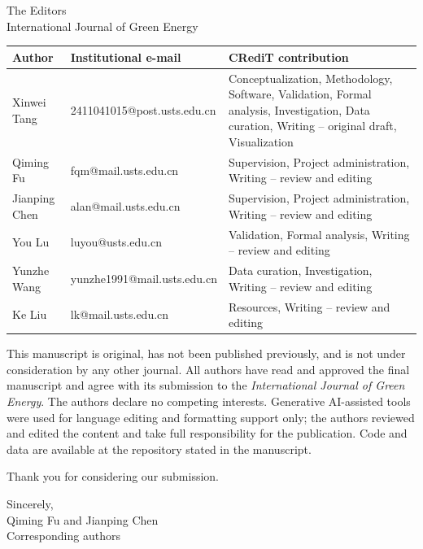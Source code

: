 \documentclass[11pt]{letter}
\begin{document}
\begin{letter}{The Editors\\International Journal of Green Energy}
\medskip
\noindent
\begin{minipage}{\linewidth}
\centering\small
\setlength{\tabcolsep}{6pt}
\begin{tabular}{@{}p{2.0cm}p{5.4cm}p{6.7cm}@{}}
\toprule
\textbf{Author} & \textbf{Institutional e-mail} & \textbf{CRediT contribution} \\
\midrule
Xinwei Tang & 2411041015@post.usts.edu.cn & Conceptualization, Methodology, Software, Validation, Formal analysis, Investigation, Data curation, Writing -- original draft, Visualization \\
Qiming Fu & fqm@mail.usts.edu.cn & Supervision, Project administration, Writing -- review and editing \\
Jianping Chen & alan@mail.usts.edu.cn & Supervision, Project administration, Writing -- review and editing \\
You Lu & luyou@usts.edu.cn & Validation, Formal analysis, Writing -- review and editing \\
Yunzhe Wang & yunzhe1991@mail.usts.edu.cn & Data curation, Investigation, Writing -- review and editing \\
Ke Liu & lk@mail.usts.edu.cn & Resources, Writing -- review and editing \\
\bottomrule
\end{tabular}
\end{minipage}
\medskip

This manuscript is original, has not been published previously, and is not under consideration by any other journal. All authors have read and approved the final manuscript and agree with its submission to the \textit{International Journal of Green Energy}. The authors declare no competing interests. Generative AI-assisted tools were used for language editing and formatting support only; the authors reviewed and edited the content and take full responsibility for the publication. Code and data are available at the repository stated in the manuscript.

Thank you for considering our submission.

\vspace{2\baselineskip}
\noindent Sincerely,\\[2\baselineskip]
Qiming Fu and Jianping Chen\\
Corresponding authors

\end{letter}
\end{document}
